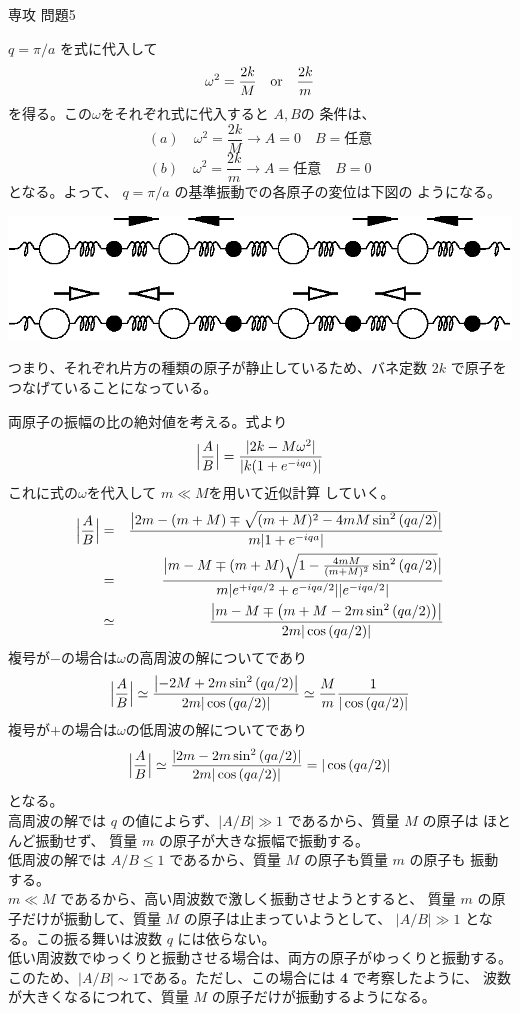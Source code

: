 \documentclass[fleqn]{jbook}
\begin{document}
\begin{answer}{専攻 問題5}{}
\begin{subanswers}
\SubAnswer
  $q=\pi/a$ を式に代入して
%
  \[ \omega^2 = \frac{2k}{M} \quad {\rm or} \quad \frac{2k}{m} \]
%
  を得る。この$\omega$をそれぞれ式に代入すると $A,B$の
  条件は、
%
  \[ (a) \quad \omega^2 = \frac{2k}{M} \longrightarrow%
         A = 0 \quad B = 任意 \]
  \[ (b) \quad \omega^2 = \frac{2k}{m} \longrightarrow%
         A = 任意 \quad B = 0 \]
%
  となる。よって、 $q = \pi/a$ の基準振動での各原子の変位は下図の
  ようになる。
%
  \begin{center}
    \mbox{\includegraphics[clip]{1994phy5-3.eps}}
  \end{center}
%
  つまり、それぞれ片方の種類の原子が静止しているため、バネ定数 $2k$
  で原子をつなげていることになっている。


\SubAnswer
  両原子の振幅の比の絶対値を考える。式より
%
  \[ \Bigl|\frac{A}{B}\Bigr|=\frac{|2k-M\omega^2|}{|k(1+e^{-iqa})|} \]
%
  これに式の$\omega$を代入して $m\ll M$を用いて近似計算
  していく。
%
  \begin{eqnarray*}
    \Bigl|\frac{A}{B}\Bigr|%
      &=& \frac{\bigl|2m-(m+M)\mp\sqrt{(m+M)^2-4mM \sin^2{(qa/2)}}\bigr|}{m|1+e^{-iqa}|} \\
      &=& \frac{\bigl|m-M\mp(m+M)\sqrt{1-\frac{4mM}{(m+M)^2} \sin^2{(qa/2)}}\bigr|}{m|e^{+iqa/2}+e^{-iqa/2}||e^{-iqa/2}|} \\
      &\simeq& \frac{\bigl|m-M \mp \bigl(m+M-2m\sin^2{(qa/2)}\bigr)\bigr|}{2m|\cos{(qa/2)}|}
  \end{eqnarray*}
%
  複号が$-$の場合は$\omega$の高周波の解についてであり
%
  \[ \Bigl|\frac{A}{B}\Bigr|%
      \simeq \frac{\bigl|-2M+2m\sin^2{(qa/2)}\bigr|}{2m|\cos{(qa/2)}|} %
      \simeq \frac{M}{m}\frac{1}{|\cos{(qa/2)}|} \]
%
  複号が$+$の場合は$\omega$の低周波の解についてであり
%
  \[ \Bigl|\frac{A}{B}\Bigr|%
      \simeq \frac{|2m-2m\sin^2{(qa/2)}|}{2m|\cos{(qa/2)}|} %
      = |\cos{(qa/2)}| \]
%
  となる。\\
%
  高周波の解では $q$ の値によらず、$|A/B|\gg 1$ であるから、質量 $M$ の原子は
  ほとんど振動せず、 質量 $m$ の原子が大きな振幅で振動する。\\
  低周波の解では $A/B \le 1 $ であるから、質量 $M$ の原子も質量 $m$ の原子も
  振動する。\\
%
  $m \ll M$ であるから、高い周波数で激しく振動させようとすると、
  質量 $m$ の原子だけが振動して、質量 $M$ の原子は止まっていようとして、
  $|A/B| \gg 1$ となる。この振る舞いは波数 $q$ には依らない。\\
%
  低い周波数でゆっくりと振動させる場合は、両方の原子がゆっくりと振動する。
  このため、$|A/B| \sim 1$である。ただし、この場合には {\bf 4} で考察したように、
  波数が大きくなるにつれて、質量 $M$ の原子だけが振動するようになる。

\end{subanswers}
\end{answer}
\end{document}
